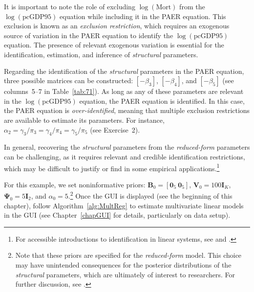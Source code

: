 It is important to note the role of excluding $\log(\text{Mort})$ from the $\log(\text{pcGDP95})$ equation while including it in the PAER equation. This exclusion is known as an \textit{exclusion restriction}, which requires an exogenous source of variation in the PAER equation to identify the $\log(\text{pcGDP95})$ equation. The presence of relevant exogenous variation is essential for the identification, estimation, and inference of \textit{structural} parameters.

Regarding the identification of the \textit{structural} parameters in the PAER equation, three possible matrices can be constructed: $[-\beta_3]$, $[-\beta_4]$, and $[-\beta_5]$ (see columns~5–7 in Table~\ref{tab:71}). As long as any of these parameters are relevant in the $\log(\text{pcGDP95})$ equation, the PAER equation is identified. In this case, the PAER equation is \textit{over-identified}, meaning that multiple exclusion restrictions are available to estimate its parameters. For instance, $\alpha_2 = \gamma_3 / \pi_3 = \gamma_4 / \pi_4 = \gamma_5 / \pi_5$ (see Exercise~2).

In general, recovering the \textit{structural} parameters from the \textit{reduced-form} parameters can be challenging, as it requires relevant and credible identification restrictions, which may be difficult to justify or find in some empirical applications.\footnote{For accessible introductions to identification in linear systems, see \cite[Chap.~19]{gujarati2009basic} and \cite[Chap.~16]{wooldridge2016introductory}.}

For this example, we set noninformative priors: $\bm{B}_0 = \left[\bm{0}_5 \ \bm{0}_5\right]$, $\bm{V}_0 = 100 \bm{I}_K$, $\bm{\Psi}_0 = 5 \bm{I}_2$, and $\alpha_0 = 5$.\footnote{Note that these priors are specified for the \textit{reduced-form} model. This choice may have unintended consequences for the posterior distributions of the \textit{structural} parameters, which are ultimately of interest to researchers. For further discussion, see \cite[p.~302]{koop2003bayesian}.} Once the GUI is displayed (see the beginning of this chapter), follow Algorithm~\ref{alg:MultReg} to estimate multivariate linear models in the GUI (see Chapter~\ref{chapGUI} for details, particularly on data setup).

